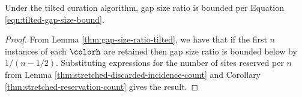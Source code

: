 \begin{theorem}
\label{thm:tilted-gap-size}
Under the tilted curation algorithm, gap size ratio is bounded per Equation \ref{eqn:tilted-gap-size-bound}.
\end{theorem}
\begin{proof}

From Lemma \ref{thm:gap-size-ratio-tilted}, we have that if the first $n$ instances of each \hv{} $\colorh$ are retained then gap size ratio is bounded below by $1/(n - 1/2)$.
Substituting expressions for the number of sites reserved per \hv{} $n$ from Lemma \ref{thm:stretched-discarded-incidence-count} and Corollary \ref{thm:stretched-reservation-count} gives the result.
\end{proof}
